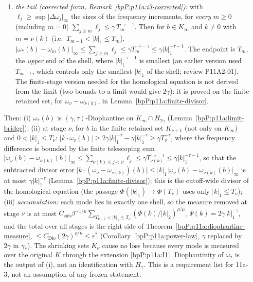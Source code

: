 \begin{remark}
\begin{enumerate}[label=(I\arabic*),ref=(I\arabic*)]
\item\label{bpP:p11a:I3} \emph{the tail (corrected form, Remark~\ref{bpP:p11a:i3-corrected}):} with $\ell_j\ge\sup\lvert\Delta\omega_j\rvert_\infty$ the sizes of the frequency increments, for \emph{every} $m\ge0$ (including $m=0$) $\sum_{j\ge m}\ell_j\le\gamma\,T_m^{-\tau-1}$. Then for $b\in K_\infty$ and $k\ne0$ with $m=\nu(k)$ (i.e.\ $T_{m-1}<\lvert k\rvert_1\le T_m$), $\lvert\omega_*(b)-\omega_m(b)\rvert_\infty\le\sum_{j\ge m}\ell_j\le\gamma T_m^{-\tau-1}\le\gamma\lvert k\rvert_1^{-\tau-1}$. The endpoint is $T_m$, the \emph{upper} end of the shell, where $\lvert k\rvert_1^{-\tau-1}$ is smallest (an earlier version used $T_{m-1}$, which controls only the smallest $\lvert k\rvert_1$ of the shell; review P11A2-01). The finite-stage version needed for the homological equation is not derived from the limit (two bounds to a limit would give $2\gamma$): it is proved on the finite retained set, for $\omega_\nu-\omega_{\nu(k)}$, in Lemma~\ref{bpP:p11a:finite-divisor}.
\end{enumerate}
Then: (i) $\omega_*(b)$ is $(\gamma,\tau)$-Diophantine on $K_\infty\cap H_{2\gamma}$ (Lemma~\ref{bpP:p11a:limit-bridge}); (ii) at stage $\nu$, for $b$ in the finite retained set $K_{\nu+1}$ (not only on $K_\infty$) and $0<\lvert k\rvert_1\le T_\nu$: $\lvert k\cdot\omega_\nu(b)\rvert\ge2\gamma\lvert k\rvert_1^{-\tau}-\gamma\lvert k\rvert_1^{-\tau}\ge\gamma T_\nu^{-\tau}$, where the frequency difference is bounded by the finite telescoping sum $\lvert\omega_\nu(b)-\omega_{\nu(k)}(b)\rvert_\infty\le\sum_{\nu(k)\le j<\nu}\ell_j\le\gamma T_{\nu(k)}^{-\tau-1}\le\gamma\lvert k\rvert_1^{-\tau-1}$, so that the subtracted divisor error $\lvert k\cdot(\omega_\nu-\omega_{\nu(k)})(b)\rvert\le\lvert k\rvert_1\lvert\omega_\nu(b)-\omega_{\nu(k)}(b)\rvert_\infty$ is at most $\gamma\lvert k\rvert_1^{-\tau}$ (Lemma~\ref{bpP:p11a:finite-divisor}); this is the cutoff-wide divisor of the homological equation (the passage $\Phi(\lvert k\rvert_1)\to\Phi(T_\nu)$ uses only $\lvert k\rvert_1\le T_\nu$); (iii) \emph{accumulation:} each mode lies in exactly one shell, so the measure removed at stage $\nu$ is at most $C_{\mathrm{sub}}\beta^{-1/\mu}\sum_{T_{\nu-1}<\lvert k\rvert_1\le T_\nu}(\Psi(k)/\lvert k\rvert_2)^{\rho/\mu}$, $\Psi(k)=2\gamma\lvert k\rvert_1^{-\tau}$, and the total over all stages is the right side of Theorem~\ref{bpP:p11a:diophantine-measure}, $\le C_{\mathrm{Dio}}(2\gamma)^{\rho/\mu}\le\varepsilon^*$ (Corollary~\ref{bpP:p11a:power-law}, $\gamma$ replaced by $2\gamma$ in $\gamma_*$). The shrinking sets $K_\nu$ cause no loss because every mode is measured over the original $K$ through the extension \ref{bpP:p11a:I1}. Diophantinity of $\omega_*$ is the output of (i), not an identification with $H_\gamma$. This is a requirement list for 11a-3, not an assumption of any frozen statement.

\end{remark}
